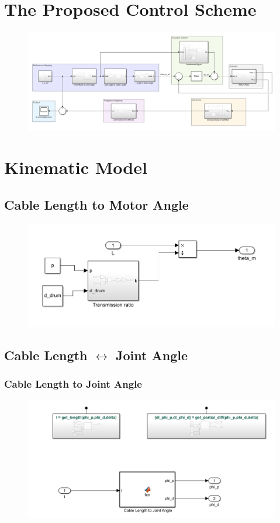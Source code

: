 \documentclass[a4paper,12pt]{report}
\begin{document}
\begin{appendices}
	\section{The Proposed Control Scheme}
	\label{appendix:d1}
	\begin{figure}[H]
		\includegraphics[width=\textwidth]{images/CDHRM_model.png}
	\end{figure}
	
	\section{Kinematic Model}
	\subsection{Cable Length to Motor Angle}
	\begin{figure}[H]
		\includegraphics[width=\textwidth]{images/g1-inv.png}
	\end{figure}
	\subsection{Cable Length $\leftrightarrow$ Joint Angle}
	
	\subsubsection{Cable Length to Joint Angle}
	\begin{figure}[H]
		\includegraphics[width=\textwidth]{images/g2.png}
	\end{figure}

\end{appendices}
\end{document}

